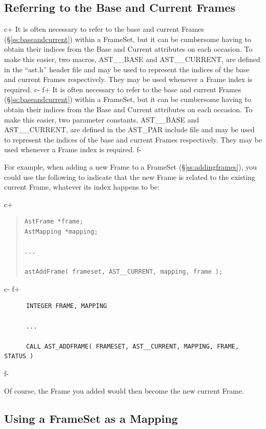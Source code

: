 \documentclass[twoside,11pt]{article}
\newcommand{\secref}[1]{\S\ref{#1}}
\newcommand{\secref}[1]{\ref{#1}}
\begin{document}
\subsection{\label{ss:astbaseandastcurrent}Referring to the Base and Current Frames}

c+
It is often necessary to refer to the base and current Frames
(\secref{ss:baseandcurrent}) within a FrameSet, but it can be
cumbersome having to obtain their indices from the Base and Current
attributes on each occasion. To make this easier, two macros,
AST\_\_BASE and AST\_\_CURRENT, are defined in the ``ast.h'' header
file and may be used to represent the indices of the base and current
Frames respectively. They may be used whenever a Frame index is
required.
c-
f+
It is often necessary to refer to the base and current Frames
(\secref{ss:baseandcurrent}) within a FrameSet, but it can be
cumbersome having to obtain their indices from the Base and Current
attributes on each occasion. To make this easier, two parameter
constants, AST\_\_BASE and AST\_\_CURRENT, are defined in the AST\_PAR
include file and may be used to represent the indices of the base and
current Frames respectively. They may be used whenever a Frame index
is required.
f-

For example, when adding a new Frame to a FrameSet
(\secref{ss:addingframes}), you could use the following to indicate
that the new Frame is related to the existing current Frame, whatever
its index happens to be:

c+
\begin{quote}
\small
\begin{verbatim}
AstFrame *frame;
AstMapping *mapping;

...

astAddFrame( frameset, AST__CURRENT, mapping, frame );
\end{verbatim}
\normalsize
\end{quote}
c-
f+
\small
\begin{verbatim}
      INTEGER FRAME, MAPPING

      ...

      CALL AST_ADDFRAME( FRAMESET, AST__CURRENT, MAPPING, FRAME, STATUS )
\end{verbatim}
\normalsize
f-

Of course, the Frame you added would then become the new current
Frame.

\subsection{\label{ss:framesetasmapping}Using a FrameSet as a Mapping}
\end{document}
